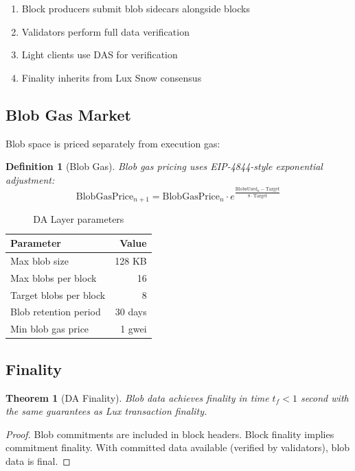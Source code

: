 \documentclass[11pt,a4paper]{article}
\newtheorem{definition}{Definition}
\newtheorem{theorem}{Theorem}
\begin{document}
\begin{enumerate}
    \item Block producers submit blob sidecars alongside blocks
    \item Validators perform full data verification
    \item Light clients use DAS for verification
    \item Finality inherits from Lux Snow consensus
\end{enumerate}

\subsection{Blob Gas Market}

Blob space is priced separately from execution gas:

\begin{definition}[Blob Gas]
Blob gas pricing uses EIP-4844-style exponential adjustment:
\begin{equation}
    \text{BlobGasPrice}_{n+1} = \text{BlobGasPrice}_n \cdot e^{\frac{\text{BlobsUsed}_n - \text{Target}}{8 \cdot \text{Target}}}
\end{equation}
\end{definition}

\begin{table}[h]
\centering
\begin{tabular}{lr}
\toprule
\textbf{Parameter} & \textbf{Value} \\
\midrule
Max blob size & 128 KB \\
Max blobs per block & 16 \\
Target blobs per block & 8 \\
Blob retention period & 30 days \\
Min blob gas price & 1 gwei \\
\bottomrule
\end{tabular}
\caption{DA Layer parameters}
\end{table}

\subsection{Finality}

\begin{theorem}[DA Finality]
Blob data achieves finality in time $t_f < 1$ second with the same guarantees as Lux transaction finality.
\end{theorem}

\begin{proof}
Blob commitments are included in block headers. Block finality implies commitment finality. With committed data available (verified by validators), blob data is final.
\end{proof}
\end{document}
